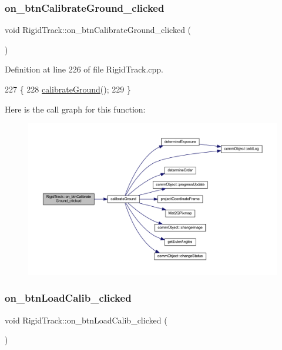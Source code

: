 \subsubsection{\texorpdfstring{on\+\_\+btn\+Calibrate\+Ground\+\_\+clicked}{on\_btnCalibrateGround\_clicked}}
{\footnotesize\ttfamily void Rigid\+Track\+::on\+\_\+btn\+Calibrate\+Ground\+\_\+clicked (\begin{DoxyParamCaption}{ }\end{DoxyParamCaption})\hspace{0.3cm}{\ttfamily [slot]}}



Definition at line 226 of file Rigid\+Track.\+cpp.


\begin{DoxyCode}
227 \{
228     \hyperlink{main_8cpp_a7ad2e3cfb5056dbab2098e0dd3bd353f}{calibrateGround}();
229 \}
\end{DoxyCode}
Here is the call graph for this function\+:\nopagebreak
\begin{figure}[H]
\begin{center}
\leavevmode
\includegraphics[width=350pt]{class_rigid_track_a9a939d6db3d268e75a603cb3d492a91b_cgraph}
\end{center}
\end{figure}
\mbox{\label{class_rigid_track_a2224d3f6d923a1c7bad356f49d7a4124}} 
\subsubsection{\texorpdfstring{on\+\_\+btn\+Load\+Calib\+\_\+clicked}{on\_btnLoadCalib\_clicked}}
{\footnotesize\ttfamily void Rigid\+Track\+::on\+\_\+btn\+Load\+Calib\+\_\+clicked (\begin{DoxyParamCaption}{ }\end{DoxyParamCaption})\hspace{0.3cm}{\ttfamily [slot]}}



